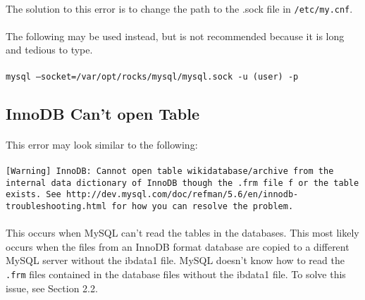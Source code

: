 \documentclass[12pt]{article}
\begin{document}
\paragraph{}The solution to this error is to change the path to the .sock file in {\tt/etc/my.cnf}.
\paragraph{}The following may be used instead, but is not recommended because it is long and tedious to type.
\paragraph{}{\tt mysql --socket=/var/opt/rocks/mysql/mysql.sock  -u (user) -p}

\subsection{InnoDB Can't open Table}
\paragraph{} This error may look similar to the following: 
\paragraph{}{\tt [Warning] InnoDB: Cannot open table wikidatabase/archive from the internal data dictionary of InnoDB though the .frm file f\
  or the table exists. See http://dev.mysql.com/doc/refman/5.6/en/innodb-
  troubleshooting.html for how you can resolve the problem.} 
\paragraph{}This occurs when MySQL can't read the tables in the databases. This most likely occurs when the files from an InnoDB format database are copied to a different MySQL server without the ibdata1 file. MySQL doesn't know how to read the {\tt.frm} files contained in the database files without the ibdata1 file. To solve this issue, see Section 2.2.
\end{document}
